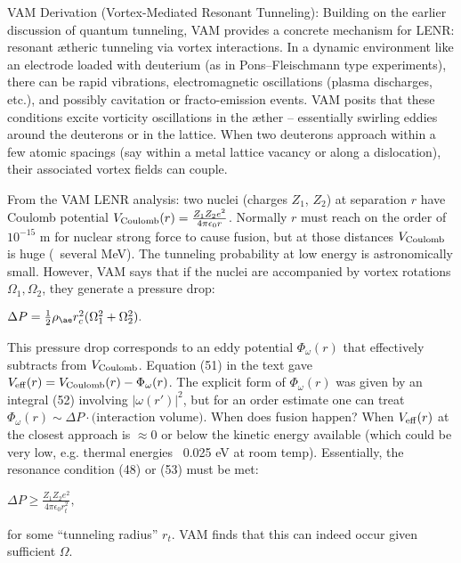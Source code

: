 \documentclass[a4paper, aps,preprint,superscriptaddress, 12pt]{revtex4}
\begin{document}
VAM Derivation (Vortex-Mediated Resonant Tunneling): Building on the earlier discussion of quantum tunneling, VAM provides a concrete mechanism for LENR: resonant ætheric tunneling via vortex interactions. In a dynamic environment like an electrode loaded with deuterium (as in Pons–Fleischmann type experiments), there can be rapid vibrations, electromagnetic oscillations (plasma discharges, etc.), and possibly cavitation or fracto-emission events. VAM posits that these conditions excite vorticity oscillations in the æther – essentially swirling eddies around the deuterons or in the lattice. When two deuterons approach within a few atomic spacings (say within a metal lattice vacancy or along a dislocation), their associated vortex fields can couple.


From the VAM LENR analysis: two nuclei (charges $Z_1$, $Z_2$) at separation $r$ have Coulomb potential $V_{\rm Coulomb}(r) = \frac{Z_1 Z_2 e^2}{4\pi\epsilon_0 r}$. Normally $r$ must reach on the order of $10^{-15}$ m for nuclear strong force to cause fusion, but at those distances $V_{\rm Coulomb}$ is huge (~several MeV). The tunneling probability at low energy is astronomically small. However, VAM says that if the nuclei are accompanied by vortex rotations $\Omega_1, \Omega_2$, they generate a pressure drop:

$\Delta P = \frac{1}{2}\rho_{\ae} r_c^2 (\Omega_1^2+\Omega_2^2).$

This pressure drop corresponds to an eddy potential $\Phi_\omega(r)$ that effectively subtracts from $V_{\rm Coulomb}$. Equation (51) in the text gave $V_{\rm eff}(r) = V_{\rm Coulomb}(r) - \Phi_\omega(r)$. The explicit form of $\Phi_\omega(r)$ was given by an integral (52) involving $|\omega(r')|^2$, but for an order estimate one can treat $\Phi_\omega(r)\sim \Delta P \cdot \text{(interaction volume)}$. When does fusion happen? When $V_{\rm eff}(r)$ at the closest approach is $\approx 0$ or below the kinetic energy available (which could be very low, e.g. thermal energies ~0.025 eV at room temp). Essentially, the resonance condition (48) or (53) must be met:

$\Delta P \ge \frac{Z_1Z_2 e^2}{4\pi\epsilon_0 r_t^2},$

for some “tunneling radius” $r_t$. VAM finds that this can indeed occur given sufficient $\Omega$.
\end{document}
